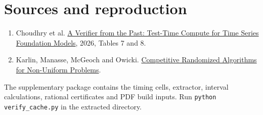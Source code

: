 \documentclass[11pt]{article}
\begin{document}
\section*{Sources and reproduction}
\begin{enumerate}\small
\item Choudhry et al. \href{https://arxiv.org/html/2611.25171v1}{A Verifier from the Past: Test-Time Compute for Time Series Foundation Models}, 2026, Tables 7 and 8.
\item Karlin, Manasse, McGeoch and Owicki. \href{https://courses.csail.mit.edu/6.895/fall03/handouts/papers/karlin.pdf}{Competitive Randomized Algorithms for Non-Uniform Problems}.
\end{enumerate}
The supplementary package contains the timing cells, extractor, interval calculations, rational certificates and PDF build inputs. Run \texttt{python verify\_cache.py} in the extracted directory.
\end{document}
